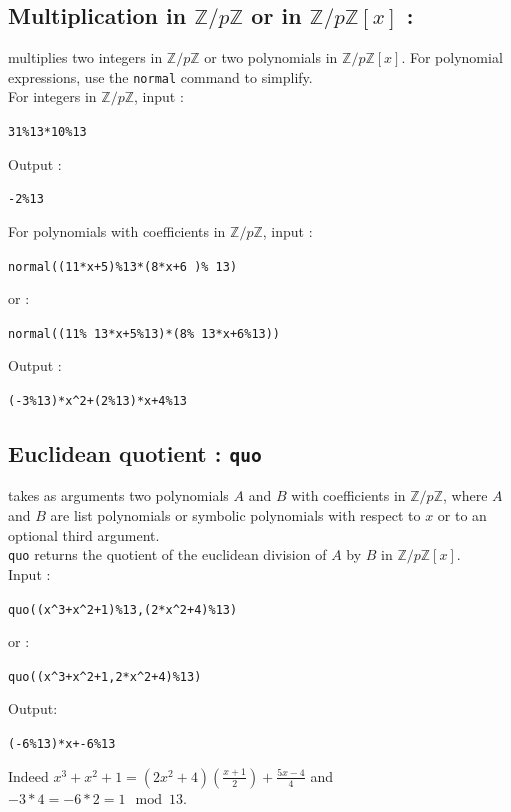 \documentclass[a4paper,11pt]{book}
\newcommand{\Z}{{\mathbb{Z}}}
\begin{document}
\subsection{Multiplication in $\Z/p\Z$ or in $ \Z/p\Z[x]$ : {\tt *}}\index{*}
\noindent {\tt *} multiplies two integers in $\Z/p\Z$ or
two polynomials in $\Z/p\Z[x]$. For polynomial expressions, 
use the {\tt normal} command to simplify.\\
For integers in $\Z/p\Z$, input :
\begin{center}{\tt 31\%13*10\%13}\end{center}
Output :
\begin{center}{\tt  -2\%13}\end{center}
For polynomials with coefficients in $\Z/p\Z$, input :
\begin{center}{\tt normal((11*x+5)\%13*(8*x+6 )\% 13)}\end{center}
or :
\begin{center}{\tt normal((11\% 13*x+5\%13)*(8\% 13*x+6\%13))}\end{center} 
Output :
\begin{center}{\tt (-3\%13)*x\verb|^|2+(2\%13)*x+4\%13}\end{center}

\subsection{Euclidean quotient  : {\tt quo}}
 takes as arguments  
two polynomials $A$ and $B$ with coefficients in $\Z/p\Z$, where
$A$ and $B$ are list polynomials or symbolic polynomials with
respect to $x$ or to an optional third argument.\\
{\tt quo} returns the quotient of the euclidean division 
of $A$ by $B$ in $\Z/p\Z[x]$.\\
Input :
\begin{center}{\tt quo((x\verb|^|3+x\verb|^|2+1)\%13,(2*x\verb|^|2+4)\%13)}\end{center}
or :
\begin{center}{\tt quo((x\verb|^|3+x\verb|^|2+1,2*x\verb|^|2+4)\%13)}\end{center}
Output:
\begin{center}{\tt (-6\%13)*x+-6\%13}\end{center}
Indeed $\displaystyle x^3+x^2+1=(2x^2+4)(\frac{x+1}{2})+\frac{5x-4}{4}$
and $-3*4=-6*2=1 \ \bmod 13$.
\end{document}

